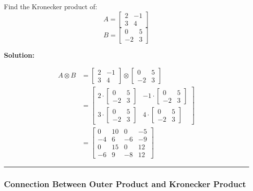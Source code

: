\documentclass[
  letterpaper,
  DIV=11,
  numbers=noendperiod]{scrreprt}
\theoremstyle{plain}
\theoremstyle{definition}
\theoremstyle{remark}
\begin{document}
Find the Kronecker product of:
\[A=\begin{bmatrix}2&-1\\3&4\end{bmatrix}\]
\[B=\begin{bmatrix}0&5\\-2&3\end{bmatrix}\]

\textbf{Solution:}

\begin{align*}
A \otimes B &= \begin{bmatrix}2&-1\\3&4\end{bmatrix} \otimes \begin{bmatrix}0&5\\-2&3\end{bmatrix} \\
&= \begin{bmatrix}
2 \cdot \begin{bmatrix}0&5\\-2&3\end{bmatrix} & -1 \cdot \begin{bmatrix}0&5\\-2&3\end{bmatrix} \\
3 \cdot \begin{bmatrix}0&5\\-2&3\end{bmatrix} & 4 \cdot \begin{bmatrix}0&5\\-2&3\end{bmatrix}
\end{bmatrix} \\
&= \begin{bmatrix}
0 & 10 & 0 & -5 \\
-4 & 6 & -6 & -9 \\
0 & 15 & 0 & 12 \\
-6 & 9 & -8 & 12
\end{bmatrix}
\end{align*}

\begin{center}\rule{0.5\linewidth}{0.5pt}\end{center}

\subsubsection{\texorpdfstring{\textbf{Connection Between Outer Product
and Kronecker
Product}}{Connection Between Outer Product and Kronecker Product}}\label{connection-between-outer-product-and-kronecker-product}
\end{document}
